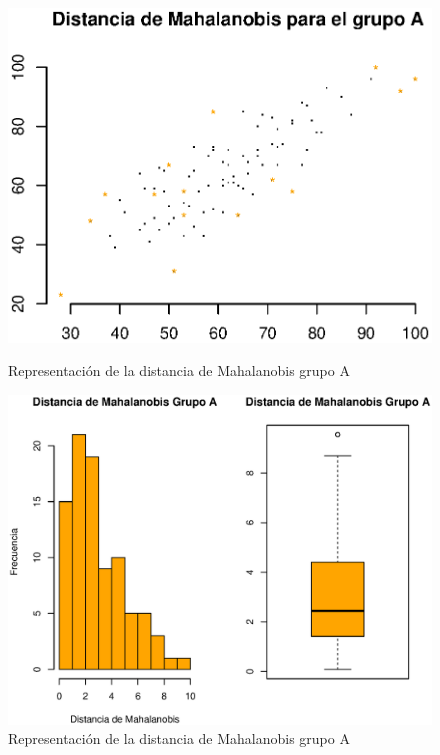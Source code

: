 \documentclass{article}
\begin{document}
    \begin{figure}[H]
        \begin{minipage}[b]{0.45\linewidth}
            \includegraphics[scale = 0.4]{Output/Plots/MahalanobisA1.eps}
            \vspace*{-6mm}
            \caption{Representaci\'on de la distancia de Mahalanobis grupo A}
            \label{fig:minipage1}
        \end{minipage}
        \hspace{0.2cm}
        \begin{minipage}[b]{0.45\linewidth}
            \includegraphics[scale = 0.4]{Output/Plots/MahalanobisA2.eps}
            \vspace*{-6mm}
            \caption{Representaci\'on de la distancia de Mahalanobis grupo A}
            \label{fig:minipage2}
        \end{minipage}
    \end{figure}
\end{document}
